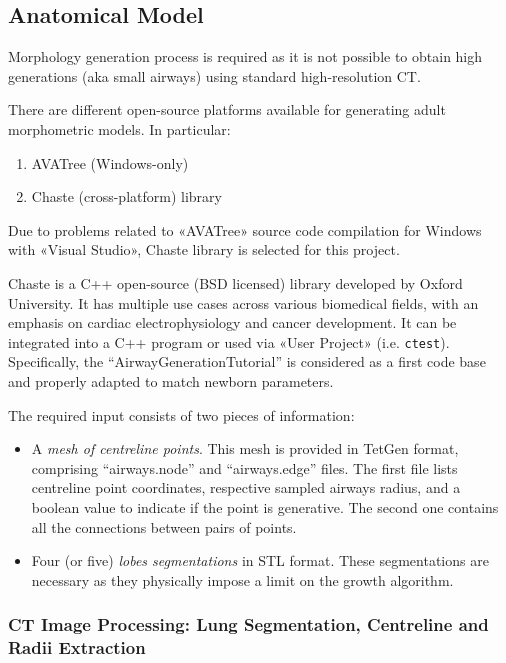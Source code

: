 \subsection{Anatomical Model}
\label{subsec:airway_development}
Morphology generation process is required as it is not possible to
obtain high generations (aka small airways) using standard
high-resolution CT\cite{bordas2015}.

There are different open-source platforms available for generating
adult morphometric models.  In particular:

\begin{enumerate}
\item AVATree (Windows-only)
\item Chaste (cross-platform) library
\end{enumerate}

Due to problems related to «AVATree» source code compilation for
Windows with «Visual Studio», Chaste library is selected for this
project.

Chaste is a C++ open-source (BSD licensed) library developed by Oxford
University.  It has multiple use cases across various biomedical
fields, with an emphasis on cardiac electrophysiology and cancer
development\cite{mirams2013}.  It can be integrated into a C++ program
or used via «User Project» (i.e. \texttt{ctest}).  Specifically, the
``AirwayGenerationTutorial'' is considered as a first code base and
properly adapted to match newborn
parameters\cite{airwaygeneration2024}.

The required input consists of two pieces of information:
\begin{itemize}
\item A \emph{mesh of centreline points}.  This mesh is provided in
  TetGen format, comprising ``airways.node'' and ``airways.edge''
  files. The first file lists centreline point coordinates,
  respective sampled airways radius, and a boolean value to indicate if
  the point is generative. The second one contains all the connections
  between pairs of points.
\item Four (or five) \emph{lobes segmentations} in STL format.  These
  segmentations are necessary as they physically impose a limit on the
  growth algorithm.
\end{itemize}

\subsubsection{CT Image Processing: Lung Segmentation, Centreline and
  Radii Extraction}
\label{subsubsec:ct_centreline_radii_extraction}

